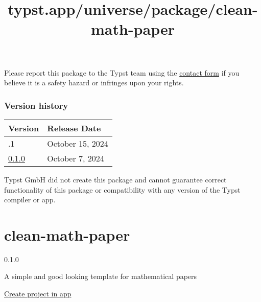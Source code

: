 Please report this package to the Typst team using the
\href{https://typst.app/contact}{contact form} if you believe it is a
safety hazard or infringes upon your rights.

\label{versions}
\subsubsection{Version history}\label{version-history}

\begin{longtable}[]{@{}ll@{}}
\toprule\noalign{}
Version & Release Date \\
\midrule\noalign{}
\endhead
\bottomrule\noalign{}
\endlastfoot
0.1.1 & October 15, 2024 \\
\href{https://typst.app/universe/package/titleize/0.1.0/}{0.1.0} &
October 7, 2024 \\
\end{longtable}

Typst GmbH did not create this package and cannot guarantee correct
functionality of this package or compatibility with any version of the
Typst compiler or app.


\title{typst.app/universe/package/clean-math-paper}

\label{banner}
\label{template-thumbnail}

\section{clean-math-paper}\label{clean-math-paper}

{ 0.1.0 }

A simple and good looking template for mathematical papers

\href{/app?template=clean-math-paper&version=0.1.0}{Create project in
app}

\label{readme}
\href{https://github.com/JoshuaLampert/clean-math-paper/actions/workflows/build.yml}{\pandocbounded{}}
\href{https://github.com/JoshuaLampert/clean-math-paper}{}
\href{https://opensource.org/licenses/MIT}{\pandocbounded{}}


